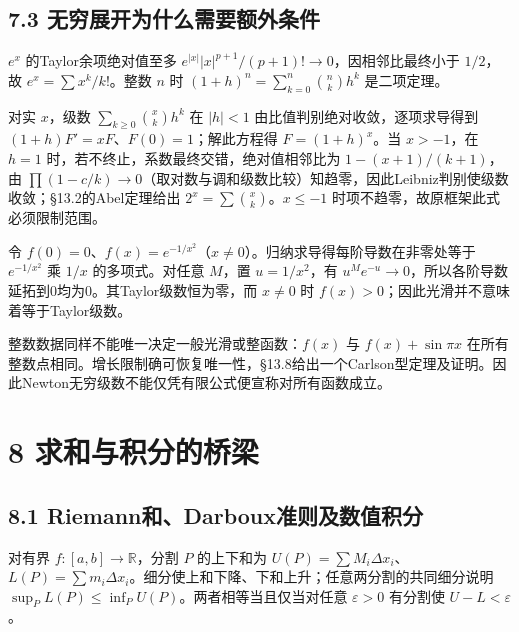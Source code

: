 \documentclass[11pt,a4paper]{article}
\begin{document}
\subsection{7.3
无穷展开为什么需要额外条件}\label{ux65e0ux7a77ux5c55ux5f00ux4e3aux4ec0ux4e48ux9700ux8981ux989dux5916ux6761ux4ef6}

\(e^x\) 的Taylor余项绝对值至多
\(e^{|x|}|x|^{p+1}/(p+1)!\to0\)，因相邻比最终小于 \(1/2\)，故
\(e^x=\sum x^k/k!\)。整数 \(n\) 时 \((1+h)^n=\sum_{k=0}^n\binom nk h^k\)
是二项定理。

对实 \(x\)，级数 \(\sum_{k\ge0}\binom xk h^k\) 在 \(|h|<1\)
由比值判别绝对收敛，逐项求导得到 \((1+h)F'=xF\)、\(F(0)=1\)；解此方程得
\(F=(1+h)^x\)。当 \(x>-1\)，在 \(h=1\)
时，若不终止，系数最终交错，绝对值相邻比为 \(1-(x+1)/(k+1)\)，由
\(\prod(1-c/k)\to0\)（取对数与调和级数比较）知趋零，因此Leibniz判别使级数收敛；§13.2的Abel定理给出
\(2^x=\sum\binom xk\)。\(x\le-1\) 时项不趋零，故原框架此式必须限制范围。

令
\(f(0)=0\)、\(f(x)=e^{-1/x^2}\)（\(x\ne0\)）。归纳求导得每阶导数在非零处等于
\(e^{-1/x^2}\) 乘 \(1/x\) 的多项式。对任意 \(M\)，置 \(u=1/x^2\)，有
\(u^Me^{-u}\to0\)，所以各阶导数延拓到0均为0。其Taylor级数恒为零，而
\(x\ne0\) 时 \(f(x)>0\)；因此光滑并不意味着等于Taylor级数。

整数数据同样不能唯一决定一般光滑或整函数：\(f(x)\) 与 \(f(x)+\sin\pi x\)
在所有整数点相同。增长限制确可恢复唯一性，§13.8给出一个Carlson型定理及证明。因此Newton无穷级数不能仅凭有限公式便宣称对所有函数成立。

\clearpage

\section{8
求和与积分的桥梁}\label{ux6c42ux548cux4e0eux79efux5206ux7684ux6865ux6881}

\subsection{8.1
Riemann和、Darboux准则及数值积分}\label{riemannux548cdarbouxux51c6ux5219ux53caux6570ux503cux79efux5206}

对有界 \(f:[a,b]\to\mathbb R\)，分割 \(P\) 的上下和为
\(U(P)=\sum M_i\Delta x_i\)、\(L(P)=\sum m_i\Delta x_i\)。细分使上和下降、下和上升；任意两分割的共同细分说明
\(\sup_PL(P)\le\inf_PU(P)\)。两者相等当且仅当对任意 \(\varepsilon>0\)
有分割使 \(U-L<\varepsilon\)。
\end{document}
